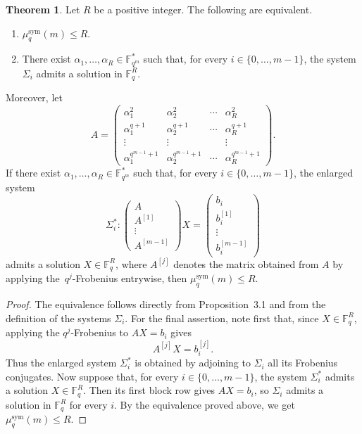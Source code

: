 \documentclass[11pt,a4paper,reqno]{article}
\numberwithin{equation}{section}
\theoremstyle{definition}
\newtheorem{theorem}{Theorem}[section]
\begin{document}
\begin{theorem}\label{thm:charactfinal}
Let \(R\) be a positive integer. The following are equivalent.
\begin{enumerate}
    \item \(\mu_q^{\mathrm{sym}}(m)\leq R\).
    \item There exist \(\alpha_1,\ldots,\alpha_R\in\mathbb F_{q^m}^{*}\) such that,
    for every \(i\in\{0,\ldots,m-1\}\), the system \(\Sigma_i\) admits a solution
    in \(\mathbb F_q^R\).
\end{enumerate}

Moreover, let
\[
A=
\begin{pmatrix}
\alpha_1^2 & \alpha_2^2 & \cdots & \alpha_R^2\\
\alpha_1^{q+1} & \alpha_2^{q+1} & \cdots & \alpha_R^{q+1}\\
\vdots & \vdots & & \vdots\\
\alpha_1^{q^{m-1}+1} & \alpha_2^{q^{m-1}+1} & \cdots & \alpha_R^{q^{m-1}+1}
\end{pmatrix}.
\]
If there exist \(\alpha_1,\ldots,\alpha_R\in\mathbb F_{q^m}^{*}\) such that, for every
\(i\in\{0,\ldots,m-1\}\), the enlarged system
\[
\Sigma_i^{*}\colon
\begin{pmatrix}
A\\
A^{[1]}\\
\vdots\\
A^{[m-1]}
\end{pmatrix}
X
=
\begin{pmatrix}
b_i\\
b_i^{[1]}\\
\vdots\\
b_i^{[m-1]}
\end{pmatrix}
\]
admits a solution \(X\in\mathbb F_q^R\), where \(A^{[j]}\) denotes the matrix obtained
from \(A\) by applying the~\(q^j\)-Frobenius entrywise, then $\mu_q^{\mathrm{sym}}(m)\leq R$.
\end{theorem}

\begin{proof}
The equivalence follows directly from Proposition~3.1 and from the definition of the systems \(\Sigma_i\). For the final assertion, note first that, since \(X\in\mathbb F_q^R\), applying the
\(q^j\)-Frobenius to \(AX=b_i\) gives
\[
A^{[j]}X=b_i^{[j]}.
\]
Thus the enlarged system \(\Sigma_i^*\) is obtained by adjoining to \(\Sigma_i\) all its Frobenius conjugates.
Now suppose that, for every \(i\in\{0,\ldots,m-1\}\), the system \(\Sigma_i^*\)
admits a solution \(X\in\mathbb F_q^R\). Then its first block row gives \(AX=b_i\),
so \(\Sigma_i\) admits a solution in \(\mathbb F_q^R\) for every \(i\). By the
equivalence proved above, we get $\mu_q^{\mathrm{sym}}(m)\leq R$.
\end{proof}
\end{document}
